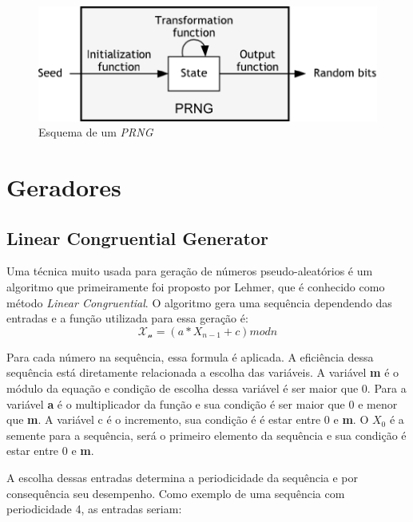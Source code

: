 \begin{figure}[h]
	\centering
	\includegraphics[scale=1]
	{figuras/prng.eps}
	\caption[Esquema de um \textit{PRNG}]{Esquema de um \textit{PRNG}\protect\footnotemark}
\end{figure}


\section{Geradores}
\subsection{Linear Congruential Generator}

Uma técnica muito usada para geração de números pseudo-aleatórios é um algoritmo que primeiramente foi proposto por Lehmer, que é conhecido como método \textit{Linear Congruential}. \cite{william-stallings} O algoritmo gera uma sequência dependendo das entradas e a função utilizada para essa geração é:
\begin{equation}
	\label{Função para geração de números aleatórios.}
	\mathcal{X_n} = (a * X_{n - 1} + c) mod n
\end{equation}

Para cada número na sequência, essa formula é aplicada. A eficiência dessa sequência está diretamente relacionada a escolha das variáveis. A variável \textbf{m} é o módulo da equação e condição de escolha dessa variável é ser maior que 0. Para a variável \textbf{a} é o multiplicador da função e sua condição é ser maior que 0 e menor que \textbf{m}. A variável c é o incremento, sua condição é é estar entre 0 e \textbf{m}. O \textbf{$X_0$} é a semente para a sequência, será o primeiro elemento da sequência e sua condição é estar entre 0 e \textbf{m}.

A escolha dessas entradas determina a periodicidade da sequência e por consequência seu desempenho. Como exemplo de uma sequência com periodicidade 4, as entradas seriam:


